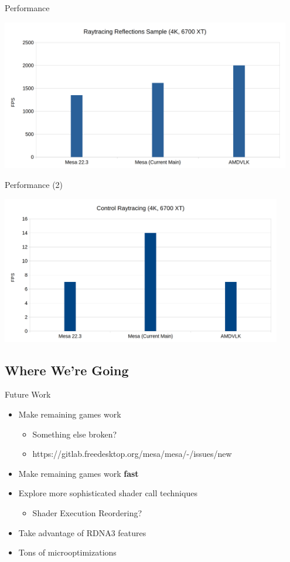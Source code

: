 \documentclass[aspectratio=169,t]{beamer}
\begin{document}
\begin{slide}{Performance}
\begin{center}
  \includegraphics[width=0.95\textwidth]{graphics/perfcomparison-rtreflections.png}
\end{center}
\end{slide}

\begin{slide}{Performance (2)}
\begin{center}
  \includegraphics[width=0.92\textwidth]{graphics/perfcomparison-control.png}
\end{center}
\end{slide}

\subsection{Where We're Going}
\begin{slide}{Future Work}
 \begin{itemize}
  \item Make remaining games work
  \begin{itemize}
    \item Something else broken?
    \item https://gitlab.freedesktop.org/mesa/mesa/-/issues/new
  \end{itemize}
  \item Make remaining games work \textbf{fast}
  \item Explore more sophisticated shader call techniques
  \begin{itemize}
   \item Shader Execution Reordering?
  \end{itemize}
  \item Take advantage of RDNA3 features
  \item Tons of microoptimizations
 \end{itemize}

\end{slide}
\end{document}

